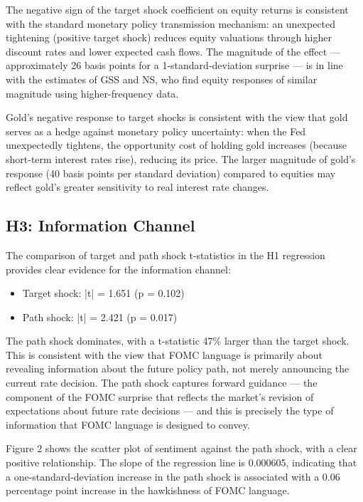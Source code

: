 \documentclass[12pt]{article}
\begin{document}
The negative sign of the target shock coefficient on equity returns is consistent with the standard monetary policy transmission mechanism: an unexpected tightening (positive target shock) reduces equity valuations through higher discount rates and lower expected cash flows. The magnitude of the effect --- approximately 26 basis points for a 1-standard-deviation surprise --- is in line with the estimates of GSS and NS, who find equity responses of similar magnitude using higher-frequency data.

Gold's negative response to target shocks is consistent with the view that gold serves as a hedge against monetary policy uncertainty: when the Fed unexpectedly tightens, the opportunity cost of holding gold increases (because short-term interest rates rise), reducing its price. The larger magnitude of gold's response (40 basis points per standard deviation) compared to equities may reflect gold's greater sensitivity to real interest rate changes.

\subsection{H3: Information Channel}

The comparison of target and path shock t-statistics in the H1 regression provides clear evidence for the information channel:

\begin{itemize}
\item Target shock: |t| = 1.651 (p = 0.102)
\item Path shock: |t| = 2.421 (p = 0.017)
\end{itemize}

The path shock dominates, with a t-statistic 47\% larger than the target shock. This is consistent with the view that FOMC language is primarily about revealing information about the future policy path, not merely announcing the current rate decision. The path shock captures forward guidance --- the component of the FOMC surprise that reflects the market's revision of expectations about future rate decisions --- and this is precisely the type of information that FOMC language is designed to convey.

Figure 2 shows the scatter plot of sentiment against the path shock, with a clear positive relationship. The slope of the regression line is 0.000605, indicating that a one-standard-deviation increase in the path shock is associated with a 0.06 percentage point increase in the hawkishness of FOMC language.
\end{document}
